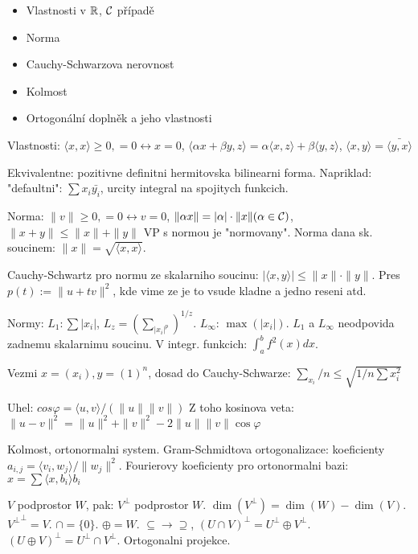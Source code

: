 \begin{itemize}
\item Vlastnosti v $\mathbb{R}$, $\mathcal{C}$ případě
\item Norma
\item Cauchy-Schwarzova nerovnost
\item Kolmost
\item Ortogonální doplněk a jeho vlastnosti
\end{itemize}

Vlastnosti: $\langle x,x\rangle\geq 0, =0\leftrightarrow x=0$,
$\langle\alpha x+\beta y,z\rangle=\alpha\langle x,z\rangle+\beta\langle
y,z\rangle$, $\langle x,y\rangle=\bar{\langle y,x\rangle}$

Ekvivalentne: pozitivne definitni hermitovska bilinearni forma.
Napriklad: "defaultni": $\sum x_i\bar{y_i}$, urcity integral na spojitych
funkcich.

Norma: $\|v\|\geq 0,=0\leftrightarrow v=0$, $\|\alpha x\|=|\alpha|\cdot\|x\|
(\alpha\in\mathcal{C})$, $\|x+y\|\leq\|x\|+\|y\|$
VP s normou je "normovany".
Norma dana sk. soucinem: $\|x\|=\sqrt{\langle x,x\rangle}$.

Cauchy-Schwartz pro normu ze skalarniho soucinu:
$|\langle x,y\rangle|\leq\|x\|\cdot\|y\|$.
Pres $p(t):=\|u+tv\|^2$, kde vime ze je to vsude kladne a jedno reseni atd.

Normy: $L_1: \sum|x_i|$, $L_z=(\sum_{|x_i|^p})^{1/z}$.
$L_\infty$: $\max(|x_i|)$. $L_1$ a $L_\infty$ neodpovida
zadnemu skalarnimu soucinu. V integr. funkcich: $\int_a^b f^2(x)dx$.

Vezmi $x=(x_i), y=(1)^n$, dosad do Cauchy-Schwarze: $\sum_{x_i}/n\leq\sqrt{1/n
\sum x_i^2}$

Uhel: $cos\varphi=\langle u,v\rangle/(\|u\|\|v\|)$
Z toho kosinova veta: $\|u-v\|^2=\|u\|^2+\|v\|^2-2\|u\|\|v\|\cos\varphi$

Kolmost, ortonormalni system.
Gram-Schmidtova ortogonalizace: koeficienty $a_{i,j}=\langle
v_i,w_j\rangle/\|w_j\|^2$.
Fourierovy koeficienty pro ortonormalni bazi: $x=\sum\langle x,b_i\rangle b_i$

$V$ podprostor $W$, pak:
$V^\perp$ podprostor $W$.
$\dim(V^\perp)=\dim(W)-\dim(V)$. ${V^\perp}^\perp=V$.
$\cap=\{0\}$. $\oplus=W$. $\subseteq\rightarrow\supseteq$,
$(U\cap V)^\perp=U^\perp \oplus V^\perp$.
$(U\oplus V)^\perp=U^\perp \cap V^\perp$.
Ortogonalni projekce.

